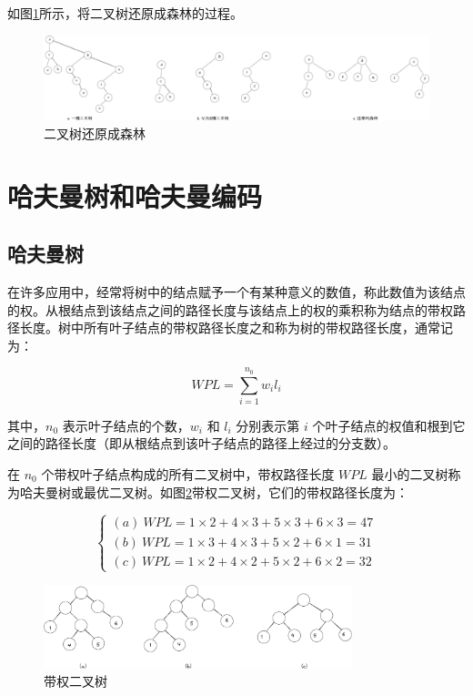 \documentclass[lang=cn,newtx,10pt,scheme=chinese]{../elegantbook}
\begin{document}
如图\ref{fig:BiTree2Forest}所示，将二叉树还原成森林的过程。

\begin{figure}[h!]
  \centering
  \includegraphics[width=1\textwidth]{./figure/pdf/cropped/Btree2Forest.pdf}
  \caption{二叉树还原成森林}
  \label{fig:BiTree2Forest}

\end{figure}
\section{哈夫曼树和哈夫曼编码}

\subsection{哈夫曼树}

在许多应用中，经常将树中的结点赋予一个有某种意义的数值，称此数值为该结点的权。从根结点到该结点之间的路径长度与该结点上的权的乘积称为结点的带权路径长度。树中所有叶子结点的带权路径长度之和称为树的带权路径长度，通常记为：

\[
WPL = \sum_{i=1}^{n_0} w_i l_i
\]

其中，$n_0$ 表示叶子结点的个数，$w_i$ 和 $l_i$ 分别表示第 $i$ 个叶子结点的权值和根到它之间的路径长度（即从根结点到该叶子结点的路径上经过的分支数）。

在 $n_0$ 个带权叶子结点构成的所有二叉树中，带权路径长度 $WPL$ 最小的二叉树称为哈夫曼树或最优二叉树。如图\ref{fig:weightBTree}带权二叉树，它们的带权路径长度为：

\[
\begin{cases}
(a) \ WPL = 1 \times 2 + 4 \times 3 + 5 \times 3 + 6 \times 3 = 47 \\
(b) \ WPL = 1 \times 3 + 4 \times 3 + 5 \times 2 + 6 \times 1 = 31 \\
(c) \ WPL = 1 \times 2 + 4 \times 2 + 5 \times 2 + 6 \times 2 = 32
\end{cases}
\]

\begin{figure}[h!]
  
  \centering

  \includegraphics[width=0.8\textwidth]{./figure/pdf/cropped/treeWeight.pdf}
  \caption{带权二叉树}
  \label{fig:weightBTree}
\end{figure}
\end{document}
